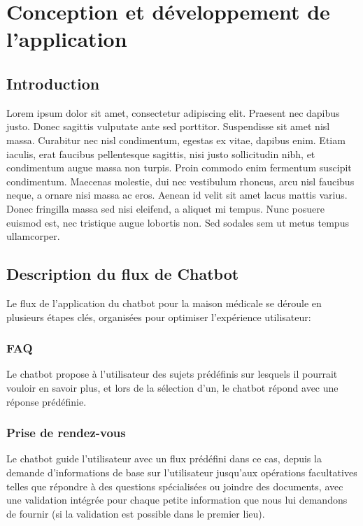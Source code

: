 \chapter{Conception et développement de l’application}
\label{chap:Chapter 3 title}
\section*{Introduction}

Lorem ipsum dolor sit amet, consectetur adipiscing elit. Praesent nec dapibus justo. Donec sagittis vulputate ante sed porttitor. Suspendisse sit amet nisl massa. Curabitur nec nisl condimentum, egestas ex vitae, dapibus enim. Etiam iaculis, erat faucibus pellentesque sagittis, nisi justo sollicitudin nibh, et condimentum augue massa non turpis. Proin commodo enim fermentum suscipit condimentum. Maecenas molestie, dui nec vestibulum rhoncus, arcu nisl faucibus neque, a ornare nisi massa ac eros. Aenean id velit sit amet lacus mattis varius. Donec fringilla massa sed nisi eleifend, a aliquet mi tempus. Nunc posuere euismod est, nec tristique augue lobortis non. Sed sodales sem ut metus tempus ullamcorper.

\newpage


\section{Description du flux de Chatbot}

\hspace{16pt}Le flux de l'application du chatbot pour la maison médicale se déroule en plusieurs étapes clés, organisées pour optimiser l'expérience utilisateur:

\subsection{FAQ}

\hspace{16pt}Le chatbot propose à l'utilisateur des sujets prédéfinis sur lesquels il pourrait vouloir en savoir plus, et lors de la sélection d'un, le chatbot répond avec une réponse prédéfinie.


\subsection{Prise de rendez-vous}

\hspace{16pt}Le chatbot guide l'utilisateur avec un flux prédéfini dans ce cas, depuis la demande d'informations de base sur l'utilisateur jusqu'aux opérations facultatives telles que répondre à des questions spécialisées ou joindre des documents, avec une validation intégrée pour chaque petite information que nous lui demandons de fournir (si la validation est possible dans le premier lieu).


